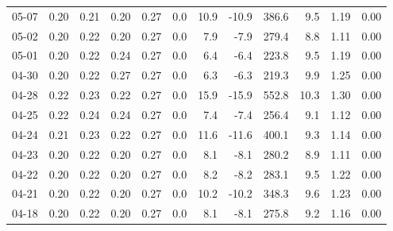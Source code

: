\begin{threeparttable}
{\begin{tabular}{lrrrrrrrrrrr}
  05-07 &          0.20 &          0.21 &          0.20 &        0.27 &                 0.0 &                10.9 &      -10.9 &               386.6 &              9.5 &            1.19 &                   0.00 \\
  05-02 &          0.20 &          0.22 &          0.20 &        0.27 &                 0.0 &                 7.9 &       -7.9 &               279.4 &              8.8 &            1.11 &                   0.00 \\
  05-01 &          0.20 &          0.22 &          0.24 &        0.27 &                 0.0 &                 6.4 &       -6.4 &               223.8 &              9.5 &            1.19 &                   0.00 \\
  04-30 &          0.20 &          0.22 &          0.27 &        0.27 &                 0.0 &                 6.3 &       -6.3 &               219.3 &              9.9 &            1.25 &                   0.00 \\
  04-28 &          0.22 &          0.23 &          0.22 &        0.27 &                 0.0 &                15.9 &      -15.9 &               552.8 &             10.3 &            1.30 &                   0.00 \\
  04-25 &          0.22 &          0.24 &          0.24 &        0.27 &                 0.0 &                 7.4 &       -7.4 &               256.4 &              9.1 &            1.12 &                   0.00 \\
  04-24 &          0.21 &          0.23 &          0.22 &        0.27 &                 0.0 &                11.6 &      -11.6 &               400.1 &              9.3 &            1.14 &                   0.00 \\
  04-23 &          0.20 &          0.22 &          0.20 &        0.27 &                 0.0 &                 8.1 &       -8.1 &               280.2 &              8.9 &            1.11 &                   0.00 \\
  04-22 &          0.20 &          0.22 &          0.20 &        0.27 &                 0.0 &                 8.2 &       -8.2 &               283.1 &              9.5 &            1.22 &                   0.00 \\
  04-21 &          0.20 &          0.22 &          0.20 &        0.27 &                 0.0 &                10.2 &      -10.2 &               348.3 &              9.6 &            1.23 &                   0.00 \\
  04-18 &          0.20 &          0.22 &          0.20 &        0.27 &                 0.0 &                 8.1 &       -8.1 &               275.8 &              9.2 &            1.16 &                   0.00 \\

\end{tabular}}
\end{threeparttable}
